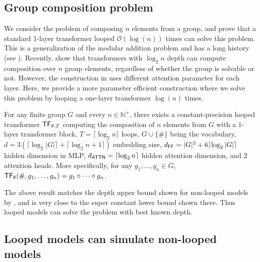 \subsection{Group composition problem}
We consider the problem of composing $n$ elements from a group, and prove that a standard 1-layer transformer looped $\mathcal{O}(\log(n))$ times can solve this problem. 
This is a generalization of the modular addition problem and has a long history (see ).
Recently, \citet{liu2022transformers} show that transformers with $\log_2 n$ depth can compute composition over $n$ group elements, regardless of whether the group is solvable or not. However, the construction in \citet{liu2022transformers} uses different attention parameter for each layer. Here, we provide a more parameter efficient construction where we solve this problem by looping a one-layer transformer $\log(n)$ times.
\begin{theorem}\label{thm:group_composition_log_depth}
    For any finite group $G$ and every $n\in\mathbb{N}^+$, there exists a constant-precision looped transformer $\mathsf{TF}_{\theta,T}$ computing the composition of $n$ elements from $G$ with a $1$-layer transformer block, $T=\lceil\log _2 n\rceil$ loops, $G\cup\{\#\}$ being the vocabulary, $d= 3\left(\lceil\log_2 |G|\rceil +\lceil\log_2 n+1\rceil\right)$ embedding size, $d_{\mathsf{FF}}=|G|^2 + 6\lceil\log_2 |G|\rceil$ hidden dimension in MLP, $d_{\mathsf{ATTN}}=\lceil\log_2 n\rceil$ hidden attention dimension, and $2$ attention heads. More specifically, for any $g_1,\ldots,g_n\in G$, $\mathsf{TF}_{\theta}(\#,g_1,\ldots, g_n) = g_1\circ\cdots \circ g_n$.
\end{theorem}

The above result matches the depth upper bound shown for non-looped models by \citet{liu2022transformers}, and is very close to the super constant lower bound shown there.
Thus looped models can solve the problem with best known depth.


\subsection{Looped models can simulate non-looped models}

